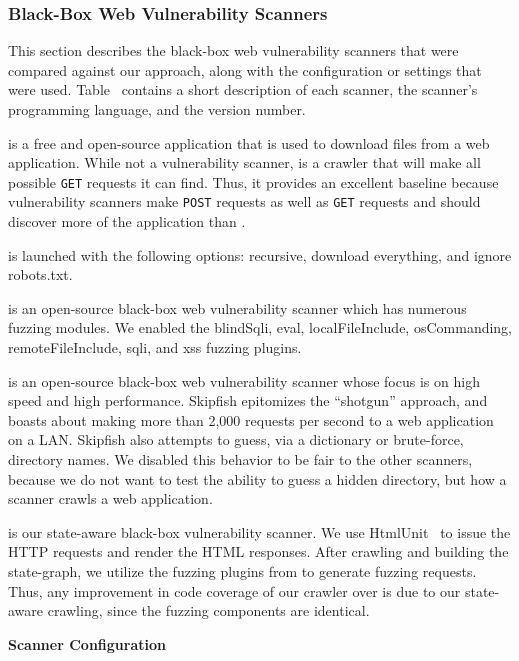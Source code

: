 \subsubsection{Black-Box Web Vulnerability Scanners}


This section describes the black-box web vulnerability scanners that were
compared against our approach, along with the configuration or settings that
were used. Table~ contains a short description of each scanner,
the scanner's programming language, and the version number.

\noindent \textbf{\wget{}} is a free and open-source application that is used
to download files from a web application. While not a vulnerability scanner,
\wget{} is a crawler that will make all possible \texttt{GET} requests it can
find. Thus, it provides an excellent baseline because vulnerability scanners make
\texttt{POST} requests as well as \texttt{GET} requests and should discover
more of the application than \wget{}.

\wget{} is launched with the following options: recursive, download everything, and
ignore robots.txt. 

\noindent \textbf{\waf{}} is an open-source black-box web vulnerability
scanner which has numerous fuzzing modules. We enabled the blindSqli, eval,
localFileInclude, osCommanding, remoteFileInclude, sqli, and xss fuzzing plugins.

\noindent \textbf{\skipfish{}} is an open-source black-box web vulnerability
scanner whose focus is on high speed and high performance. Skipfish epitomizes
the ``shotgun'' approach, and boasts about making more than 2,000 requests per
second to a web application on a LAN. Skipfish also attempts to guess, via a
dictionary or brute-force, directory names. We disabled this behavior
to be fair to the other scanners, because we do not want to test the ability to
guess a hidden directory, but how a scanner crawls a web
application.

\noindent \textbf{\crawler{}} is our state-aware black-box vulnerability
scanner. We use HtmlUnit~\cite{htmlunit} to issue the HTTP requests and render
the HTML responses. After crawling and building the state-graph, we utilize the
fuzzing plugins from \waf{} to generate fuzzing requests. Thus, any improvement
in code coverage of our crawler over \waf{} is due to our state-aware crawling,
since the fuzzing components are identical.


\noindent \textbf{Scanner Configuration}

